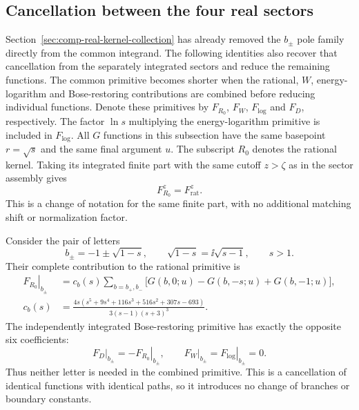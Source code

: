\subsection{Cancellation between the four real sectors}
Section~\ref{sec:comp-real-kernel-collection} has already removed the
$b_\pm$ pole family directly from the common integrand. The following
identities also recover that cancellation from the separately integrated
sectors and reduce the remaining functions.
The common primitive becomes shorter when the rational, $W$,
energy-logarithm and Bose-restoring contributions are combined before
reducing individual functions. Denote these primitives by
$F_{R_0}$, $F_W$, $F_{\log}$ and $F_D$, respectively. The factor
$\ln s$ multiplying the energy-logarithm primitive is included in
$F_{\log}$. All $G$ functions in this subsection have the same
basepoint $r=\sqrt{s}$ and the same final argument $u$.
The subscript $R_0$ denotes the rational kernel. Taking its integrated
finite part with the same cutoff $z>\zeta$ as in the sector assembly gives
\begin{equation}
 F_{R_0}^z=F_{\mathrm{rat}}^z.
\end{equation}
This is a change of notation for the same finite part, with no
additional matching shift or normalization factor.

Consider the pair of letters
\begin{equation}
 b_\pm=-1\pm\sqrt{1-s},\qquad
 \sqrt{1-s}=\ii\sqrt{s-1},\qquad s>1.
\end{equation}
Their complete contribution to the rational primitive is
\begin{align}
 \left.F_{R_0}\right|_{b_\pm}
 &=c_b(s)\sum_{b=b_+,b_-}
       \bigl[G(b,0;u)-G(b,-s;u)+G(b,-1;u)\bigr],\\
 c_b(s)&=\frac{4s\left(s^5+9s^4+116s^3+516s^2+307s-693\right)}
                   {3(s-1)(s+3)^3}.
\end{align}
The independently integrated Bose-restoring primitive has exactly the
opposite six coefficients:
\begin{equation}
 \left.F_D\right|_{b_\pm}=-\left.F_{R_0}\right|_{b_\pm},
 \qquad \left.F_W\right|_{b_\pm}=\left.F_{\log}\right|_{b_\pm}=0.
 \label{eq:comp-real-four-b-cancel}
\end{equation}
Thus neither letter is needed in the combined primitive. This is a
cancellation of identical functions with identical paths, so it introduces
no change of branches or boundary constants.

